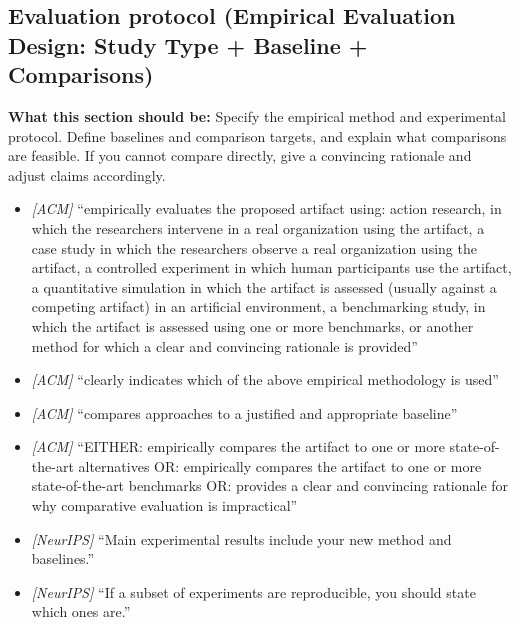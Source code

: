 \documentclass[11pt]{article}
\begin{document}
\subsection{Evaluation protocol (Empirical Evaluation Design: Study Type + Baseline + Comparisons)}
\noindent\textbf{What this section should be:}
Specify the empirical method and experimental protocol. Define baselines and comparison targets, and explain what comparisons are feasible. If you cannot compare directly, give a convincing rationale and adjust claims accordingly.
\begin{itemize}
  \item \textit{[ACM]} ``empirically evaluates the proposed artifact using: action research, in which the researchers intervene in a real organization using the artifact, a case study in which the researchers observe a real organization using the artifact, a controlled experiment in which human participants use the artifact, a quantitative simulation in which the artifact is assessed (usually against a competing artifact) in an artificial environment, a benchmarking study, in which the artifact is assessed using one or more benchmarks, or another method for which a clear and convincing rationale is provided''
  \item \textit{[ACM]} ``clearly indicates which of the above empirical methodology is used''
  \item \textit{[ACM]} ``compares approaches to a justified and appropriate baseline''
  \item \textit{[ACM]} ``EITHER: empirically compares the artifact to one or more state-of-the-art alternatives OR: empirically compares the artifact to one or more state-of-the-art benchmarks OR: provides a clear and convincing rationale for why comparative evaluation is impractical''
  \item \textit{[NeurIPS]} ``Main experimental results include your new method and baselines.''
  \item \textit{[NeurIPS]} ``If a subset of experiments are reproducible, you should state which ones are.''
\end{itemize}
\end{document}
